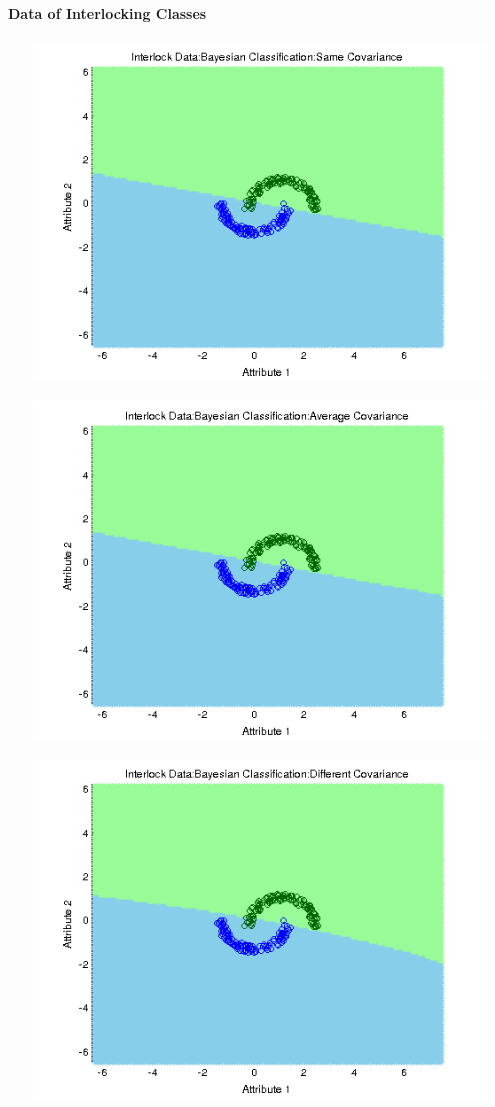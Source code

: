 \documentclass[a4paper]{article}
\begin{document}
			\paragraph{Data of Interlocking Classes}
			\centerline{\includegraphics[width=160mm,height=90mm]{plots/bayes/nls/interlock/same_cov.png}}
 			\centerline{\includegraphics[width=160mm,height=90mm]{plots/bayes/nls/interlock/avg_cov.png}}
 			\centerline{\includegraphics[width=160mm,height=90mm]{plots/bayes/nls/interlock/diff_cov.png}}
\end{document}
